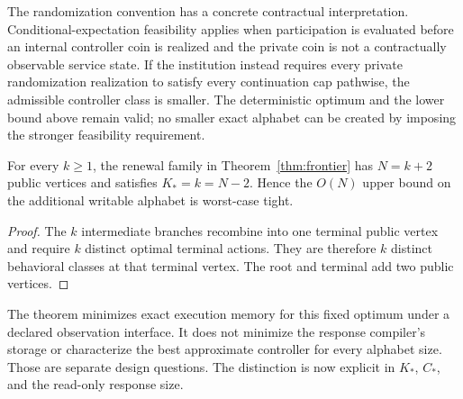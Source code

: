 The randomization convention has a concrete contractual interpretation. Conditional-expectation feasibility applies when participation is evaluated before an internal controller coin is realized and the private coin is not a contractually observable service state. If the institution instead requires every private randomization realization to satisfy every continuation cap pathwise, the admissible controller class is smaller. The deterministic optimum and the lower bound above remain valid; no smaller exact alphabet can be created by imposing the stronger feasibility requirement.

\begin{corollary}\label{cor:memory-tight}
For every $k\geq1$, the renewal family in Theorem~\ref{thm:frontier} has $N=k+2$ public vertices and satisfies $K_*=k=N-2$. Hence the $O(N)$ upper bound on the additional writable alphabet is worst-case tight.
\end{corollary}
\begin{proof}
The $k$ intermediate branches recombine into one terminal public vertex and require $k$ distinct optimal terminal actions. They are therefore $k$ distinct behavioral classes at that terminal vertex. The root and terminal add two public vertices.
\end{proof}

The theorem minimizes exact execution memory for this fixed optimum under a declared observation interface. It does not minimize the response compiler's storage or characterize the best approximate controller for every alphabet size. Those are separate design questions. The distinction is now explicit in $K_*$, $C_*$, and the read-only response size.

